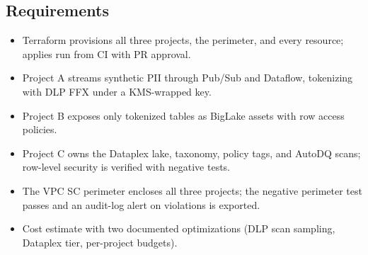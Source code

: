 \subsection*{Requirements}
\begin{itemize}
    \item Terraform provisions all three projects, the perimeter, and every resource; applies run from CI with PR approval.
    \item Project A streams synthetic PII through Pub/Sub and Dataflow, tokenizing with DLP FFX under a KMS-wrapped key.
    \item Project B exposes only tokenized tables as BigLake assets with row access policies.
    \item Project C owns the Dataplex lake, taxonomy, policy tags, and AutoDQ scans; row-level security is verified with negative tests.
    \item The VPC SC perimeter encloses all three projects; the negative perimeter test passes and an audit-log alert on violations is exported.
    \item Cost estimate with two documented optimizations (DLP scan sampling, Dataplex tier, per-project budgets).
\end{itemize}

